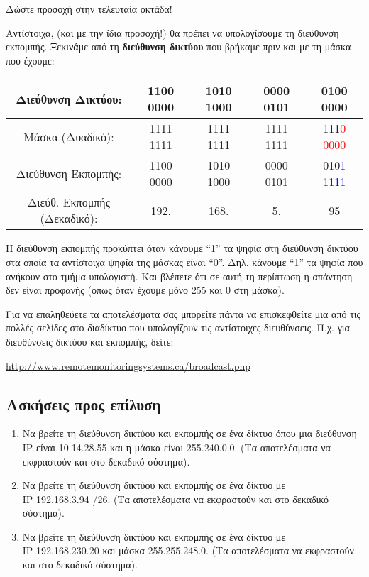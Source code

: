 Δώστε προσοχή στην τελευταία οκτάδα!

Αντίστοιχα, (και με την ίδια προσοχή!) θα πρέπει να υπολογίσουμε τη διεύθυνση εκπομπής. Ξεκινάμε από τη \textbf{διεύθυνση δικτύου} που βρήκαμε πριν και με τη μάσκα που έχουμε:

\begin{center}
\fontsize{9}{11}
\ttfamily
\begin{tabular}{|c|c|c|c|c|}
\hline
 Διεύθυνση Δικτύου: & 1100 0000 & 1010 1000 & 0000 0101 & 0100 0000\\ 
\hline
Μάσκα (Δυαδικό): & 1111 1111 & 1111 1111 & 1111 1111 & 111\textcolor{red}{0 0000} \\
\hline
Διεύθυνση Εκπομπής: & 1100 0000 & 1010 1000 & 0000 0101 & 010\textcolor{blue}{1 1111}\\
 \hline
 Διεύθ. Εκπομπής (Δεκαδικό): & 192. & 168. & 5. & 95\\
 \hline
\end{tabular}
\normalfont
\end{center}

Η διεύθυνση εκπομπής προκύπτει όταν κάνουμε ``1'' τα ψηφία στη διεύθυνση δικτύου στα οποία τα αντίστοιχα ψηφία της μάσκας είναι ``0''. Δηλ. κάνουμε ``1'' τα ψηφία που ανήκουν στο τμήμα υπολογιστή. Και βλέπετε ότι σε αυτή τη περίπτωση η απάντηση δεν είναι προφανής (όπως όταν έχουμε μόνο 255 και 0 στη μάσκα).

Για να επαληθεύετε τα αποτελέσματα σας μπορείτε πάντα να επισκεφθείτε μια από τις πολλές σελίδες στο διαδίκτυο που υπολογίζουν τις αντίστοιχες διευθύνσεις. Π.χ. για διευθύνσεις δικτύου και εκπομπής, δείτε:

\begin{center}
\url{http://www.remotemonitoringsystems.ca/broadcast.php}
\end{center}

\subsection*{Ασκήσεις προς επίλυση}

\begin{enumerate}
\item Να βρείτε τη διεύθυνση δικτύου και εκπομπής σε ένα δίκτυο όπου μια διεύθυνση IP είναι 10.14.28.55 και η μάσκα είναι 255.240.0.0. (Τα αποτελέσματα να εκφραστούν και στο δεκαδικό σύστημα).
\item Να βρείτε τη διεύθυνση δικτύου και εκπομπής σε ένα δίκτυο με\\ IP 192.168.3.94 /26. (Τα αποτελέσματα να εκφραστούν και στο δεκαδικό σύστημα).
\item Να βρείτε τη διεύθυνση δικτύου και εκπομπής σε ένα δίκτυο με\\ IP 192.168.230.20 και μάσκα 255.255.248.0. (Τα αποτελέσματα να εκφραστούν και στο δεκαδικό σύστημα).
\end{enumerate}

